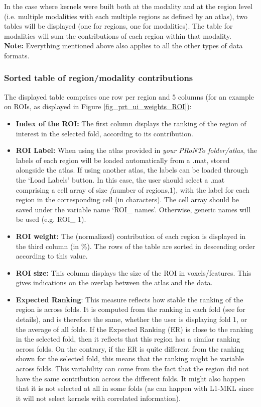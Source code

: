 In the case where kernels were built both at the modality and at the region level (i.e. multiple modalities with each multiple regions as defined by an atlas), two tables will be displayed (one for regions, one for modalities). The table for modalities will sum the contributions of each region within that modality.
\\

\noindent \textbf{Note:} Everything mentioned above also applies to all the other types of data formats.

\subsubsection{Sorted table of region/modality contributions}

The displayed table comprises one row per region and 5 columns (for an example on ROIs, as displayed in Figure \ref{fig_prt_ui_weights_ROI}):

\begin{itemize}
\item \textbf{Index of the ROI:} The first column displays the ranking of the region of interest in the selected fold, according to its contribution.
\item \textbf{ROI Label:} When using the atlas provided in \textit{your PRoNTo folder/atlas}, the labels of each region will be loaded automatically from a .mat, stored alongside the atlas. If using another atlas, the labels can be loaded through the `Load Labels' button. In this case, the user should select a .mat comprising a cell array of size \textit(number of regions,1), with the label for each region in the corresponding cell (in characters). The cell array should be saved under the variable name `ROI\_ names'. Otherwise, generic names will be used (e.g. ROI\_ 1).
\item \textbf{ROI weight:} The (normalized) contribution of each region is displayed in the third column (in \%). The rows of the table are sorted in descending order according to this value. 
\item \textbf{ROI size:} This column displays the size of the ROI in voxels/features. This gives indications on the overlap between the atlas and the data.

\item \textbf{Expected Ranking}: This measure reflects how stable the ranking of the region is across folds. It is computed from the ranking in each fold (see \cite{Schrouff2013a} for details), and is therefore the same, whether the user is displaying fold 1, or the average of all folds. If the Expected Ranking (ER) is close to the ranking in the selected fold, then it reflects that this region has a similar ranking across folds. On the contrary, if the ER is quite different from the ranking shown for the selected fold, this means that the ranking might be variable across folds. This variability can come from the fact that the region did not have the same contribution across the different folds. It might also happen that it is not selected at all in some folds (as can happen with L1-MKL since it will not select kernels with correlated information).
\end{itemize}

